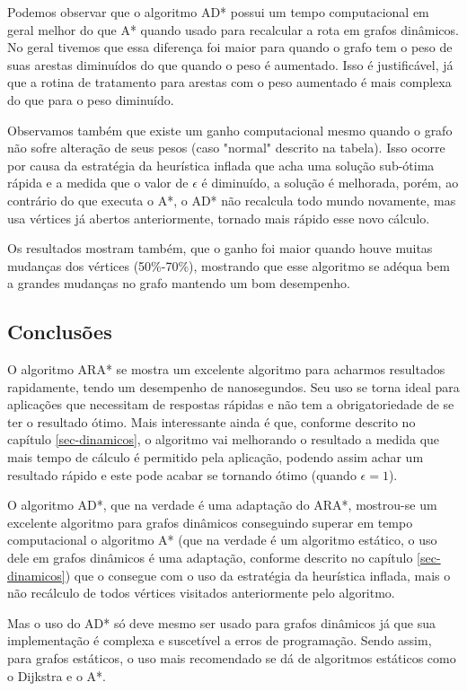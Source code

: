 Podemos observar que o algoritmo AD* possui um tempo computacional em geral melhor do que A* quando usado para recalcular a rota em grafos dinâmicos. No geral tivemos que essa diferença foi maior para quando o grafo tem o peso de suas arestas diminuídos do que quando o peso é aumentado. Isso é justificável, já que a rotina de tratamento para arestas com o peso aumentado é mais complexa do que para o peso diminuído.

Observamos também que existe um ganho computacional mesmo quando o grafo não sofre alteração de seus pesos (caso "normal" descrito na tabela). Isso ocorre por causa da estratégia da heurística inflada que acha uma solução sub-ótima rápida e a medida que  o valor de $\epsilon$ é diminuído, a solução é melhorada, porém, ao contrário do que executa o A*, o AD* não recalcula todo mundo novamente, mas usa vértices já abertos anteriormente, tornado mais rápido esse novo cálculo.

Os resultados mostram também, que o ganho foi maior quando houve muitas mudanças dos vértices (50\%-70\%), mostrando que esse algoritmo se adéqua bem a grandes mudanças no grafo mantendo um bom desempenho.

\subsection{Conclusões}
\label{sec-experimentos-dinamicos-conclusao}

O algoritmo ARA* se mostra um excelente algoritmo para acharmos resultados rapidamente, tendo um desempenho de nanosegundos. Seu uso se torna ideal para aplicações que necessitam de respostas rápidas e não tem a obrigatoriedade de se ter o resultado ótimo. Mais interessante ainda é que, conforme descrito no capítulo \ref{sec-dinamicos}, o algoritmo vai melhorando o resultado a medida que mais tempo de cálculo é permitido pela aplicação, podendo assim achar um resultado rápido e este pode acabar se tornando ótimo (quando $\epsilon = 1$).

O algoritmo AD*, que na verdade é uma adaptação do ARA*, mostrou-se um excelente algoritmo para grafos dinâmicos conseguindo superar em tempo computacional o algoritmo A* (que na verdade é um algoritmo estático, o uso dele em grafos dinâmicos é uma adaptação, conforme descrito no capítulo \ref{sec-dinamicos}) que o consegue com o uso da estratégia da heurística inflada, mais o não recálculo de todos vértices visitados anteriormente pelo algoritmo.

Mas o uso do AD* só deve mesmo ser usado para grafos dinâmicos já que sua implementação é complexa e suscetível a erros de programação. Sendo assim, para grafos estáticos, o uso mais recomendado se dá de algoritmos estáticos como o Dijkstra e o A*.
